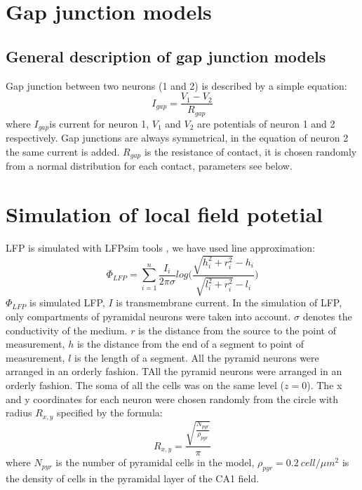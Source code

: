 \documentclass[a4paper,12pt]{article}
\begin{document}
\section{Gap junction models} \label{gap_junctions_models}
\subsection{General description of gap junction models}
Gap junction between two neurons (1 and 2) is described by a simple equation:
\begin{equation}
I_{gap} = \frac{V_{1} - V_{2}}{R_{gap}}
\end{equation}
where $I_{gap}$is current for neuron 1, $V_{1}$ and $V_{2}$ are potentials of neuron 1 and 2 respectively. Gap junctions are always symmetrical, in the equation of neuron 2 the same current is added. $R_{gap}$ is the resistance of contact, it is chosen randomly from a normal distribution for each contact, parameters see below.





\section{Simulation of local field potetial} \label{field_potetial_model}
LFP is simulated with LFPsim tools \cite{parasuram_computational_2016}, we have used line approximation:
\begin{equation} 
\Phi_{LFP} = \sum^{n}_{i=1}{ \frac{I_i}{2\pi \sigma}log \Big(\frac{\sqrt{h_i^2 + r_i^2}-h_i}{\sqrt{l_i^2 + r_i^2}-l_i} } \Big)
\end{equation}
$\Phi_{LFP}$ is simulated LFP, $I$ is transmembrane current. In the simulation of LFP, only compartments of pyramidal neurons were taken into account. $\sigma$ denotes the conductivity of the medium. $r$ is the distance from the source to the point of measurement, $h$  is the distance from the end of a segment to point of measurement, $l$ is the length of a segment. All the pyramid neurons were arranged in an orderly fashion. TAll the pyramid neurons were arranged in an
orderly fashion. The soma of all the cells was on the same level ($z = 0$). The x and y coordinates for each neuron were chosen randomly from the circle with radius $R_{x, y}$ specified by the formula:
\begin{equation} 
R_{x, y} = \frac{\sqrt{\frac{N_{pyr}}{\rho_{pyr}} }} {\pi}
\end{equation}
where $N_{pyr}$ is the number of pyramidal cells in the model, $\rho_{pyr} = 0.2 \ cell/\mu m^2$ is the density of cells in the pyramidal layer of the CA1 field.



\end{document}
